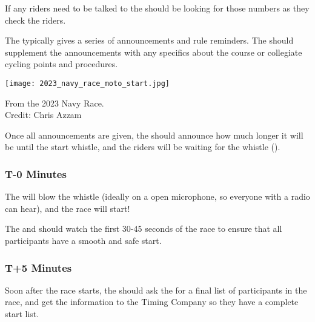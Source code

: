 If any riders need to be talked to%
the  should be looking for those numbers as they check the riders.

The  typically gives a series of announcements and rule reminders.
The  should supplement the announcements with any specifics about the course or collegiate cycling points and procedures.

\begin{marginfigure}
  \texttt{[image: 2023\_navy\_race\_moto\_start.jpg]}
  \caption[Motorcycle referee starting a race]{From the 2023 Navy Race.\\
            Credit: Chris Azzam}
\end{marginfigure}

Once all announcements are given, the  should announce how much longer it will be until the start whistle,
and the riders will be waiting for the whistle ().

\subsubsection{T-0 Minutes}

The  will blow the whistle (ideally on a open microphone, so everyone with a radio can hear),
and the race will start!

The  and  should watch the first 30-45 seconds of the race
to ensure that all participants have a smooth and safe start.

\subsubsection{T+5 Minutes}

Soon after the race starts, the  should ask the  for a final list of
participants in the race, and get the information to the Timing Company so they have a complete start list.
